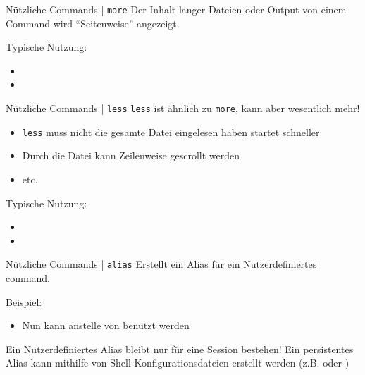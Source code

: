 \documentclass{setbeamer}
\begin{document}
\begin{frame}{Nützliche Commands | \texttt{more}}
    Der Inhalt langer Dateien oder Output von einem Command wird ``Seitenweise'' angezeigt.

    \vspace{0.3cm}

    Typische Nutzung:
    \begin{itemize}
        \item {}
        \item {}
    \end{itemize}
\end{frame}

\begin{frame}{Nützliche Commands | \texttt{less}}
    \texttt{less} ist ähnlich zu \texttt{more}, kann aber wesentlich mehr!
    \begin{itemize}
        \item \texttt{less} muss nicht die gesamte Datei eingelesen haben {\Large \MVRightarrow} startet schneller
        \item Durch die Datei kann Zeilenweise gescrollt werden
        \item etc.
    \end{itemize}

    \vspace{0.3cm}

    Typische Nutzung:
    \begin{itemize}
        \item {}
        \item {}
    \end{itemize}
\end{frame}

\begin{frame}{Nützliche Commands | \texttt{alias}}
    Erstellt ein Alias für ein Nutzerdefiniertes command.

    \vspace{0.3cm}

    Beispiel:
    \begin{itemize}
        \item {}\textemdash Nun kann  anstelle von  benutzt werden
    \end{itemize}

    \vspace{0.3cm}
    Ein Nutzerdefiniertes Alias bleibt nur für eine Session bestehen!
    {\Large \MVRightarrow} Ein persistentes Alias kann mithilfe von Shell-Konfigurationsdateien erstellt werden (z.B.  oder )
\end{frame}
\end{document}
